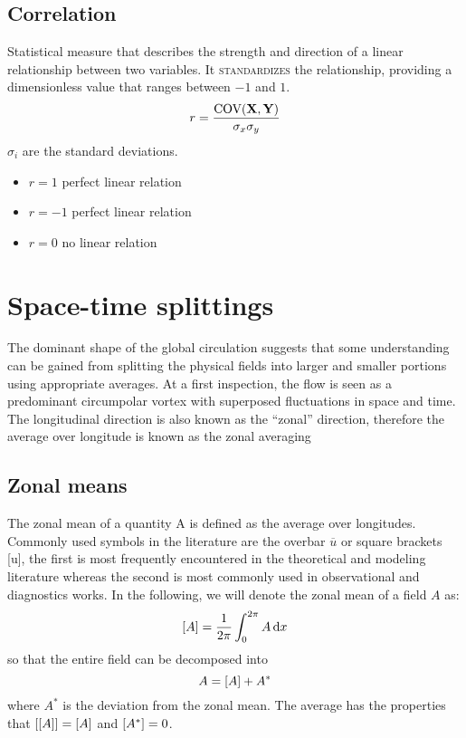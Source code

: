 \subsection{Correlation}\label{subsec:correlation}
Statistical measure that describes the strength and direction of a linear relationship between two variables. It \textsc{standardizes} the relationship, providing a dimensionless value that ranges between $-1$ and $1$.
\begin{equation}
	r=\frac{\text{COV}(\mathbf{X},\mathbf{Y})}{\sigma_x\sigma_y}
	\label{eq:linear-correlation-def}
\end{equation}
$\sigma_i$ are the standard deviations.
\begin{itemize}
	\item $r=1$ perfect  linear relation
	\item $r=-1$  perfect  linear relation
	\item $r=0$ no linear relation
\end{itemize}


\section{Space-time splittings}\label{sec:space-time-splittings}
The dominant shape of the global circulation suggests that some understanding can be gained from splitting the physical fields into larger and smaller portions using appropriate averages. At a first inspection, the flow is seen as a predominant circumpolar vortex with superposed fluctuations in space and time. The longitudinal direction is also known as the “zonal” direction, therefore the average over longitude is known as the zonal averaging

\subsection{Zonal means}\label{subsec:zonal-mean}
The zonal mean of a quantity A is defined as the average over longitudes.
Commonly used symbols in the literature are the overbar $\overline{u}$ or square brackets [u],
the first is most frequently encountered in the theoretical and modeling literature whereas the second is most commonly used in observational and diagnostics works.
In the following, we will denote the zonal mean of a field $A$ as:
\begin{equation}
	[A] = \frac{1}{2\pi}\int_0^{2\pi} A \,\mathrm{d}x
	\label{eq:zonal-mean-def}
\end{equation}
so that the entire field can be decomposed into
\begin{equation}
	A = [A]+ A^*
	\label{eq:field-zonal-mean-decomp}
\end{equation}
where $A^*$ is the deviation from the zonal mean.
The average has the properties that \( [[A]] = [A]\) and \([A^*]=0\).

